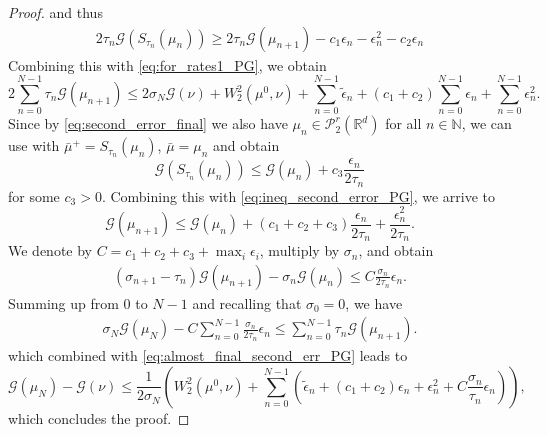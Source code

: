 \documentclass[11pt]{article}
\newcommand{\cP}{\mathcal{P}}
\newcommand{\cG}{\mathcal{G}}
\newcommand{\cT}{S}
\newcommand{\R}{\mathbb{R}}
\newcommand{\N}{\mathbb{N}}
\numberwithin{equation}{section}
\begin{document}
\begin{proof}
	and thus
	\begin{equation}\label{eq:ineq_second_error_PG}
		\begin{aligned}
			2\tau_n\mathcal{G}(\cT_{\tau_{n}}( \mu_{n})) \geq 2\tau_n\mathcal{G}(\mu_{n+1}) - c_1\epsilon_n - \epsilon_n^2 - c_2 \epsilon_n
		\end{aligned}
	\end{equation}
	Combining this with \eqref{eq:for_rates1_PG}, we obtain
	\begin{equation}\label{eq:almost_final_second_err_PG}
		2\sum_{n=0}^{N-1}\tau_n\cG(\mu_{n+1})\leq 2\sigma_N \cG(\nu)+W_2^2(\mu^0,\nu)+\sum_{n=0}^{N-1}\tilde{\epsilon}_n+(c_1+c_2)\sum_{n=0}^{N-1}\epsilon_n + \sum_{n=0}^{N-1}\epsilon_n^2.
	\end{equation}
	Since by \eqref{eq:second_error_final} we also have $\mu_n\in \cP_2^r(\R^d)$ for all $n\in \N$, we can use  with $\bar \mu^+=\cT_{\tau_{n}}( \mu_{n})$, $\bar \mu = \mu_n$ and obtain
	\begin{equation}
		\mathcal{G}(\cT_{\tau_{n}}( \mu_{n})) \leq \mathcal{G}(\mu_n) + c_3\frac{\epsilon_n}{2\tau_n}
	\end{equation}
	for some $c_3 > 0$. Combining this with \eqref{eq:ineq_second_error_PG}, we arrive to
	\begin{equation*}
		\mathcal{G}(\mu_{n+1}) \leq \mathcal{G}(\mu_n) + (c_1+c_2+c_3)\frac{\epsilon_n}{2\tau_n} + \frac{\epsilon_n^2}{2\tau_n}.
	\end{equation*}
	We denote by $C = c_1+c_2+c_3+\max_i \epsilon_i$, multiply by $\sigma_n$, and obtain
	\begin{equation}
		\begin{aligned}
			(\sigma_{n+1}-\tau_n)\cG(\mu_{n+1}) - \sigma_{n}\cG(\mu_n) \leq C\frac{\sigma_n}{2\tau_n}\epsilon_n.
		\end{aligned}
	\end{equation}
	Summing up from $0$ to $N-1$ and recalling that $\sigma_0=0$, we have
	\begin{equation}
		\begin{aligned}
			\sigma_{N}\cG(\mu_N) - C \sum_{n=0}^{N-1}\frac{\sigma_n}{2\tau_n}\epsilon_{n} \leq \sum_{n=0}^{N-1}\tau_n \cG(\mu_{n+1}).
		\end{aligned}
	\end{equation}
	which combined with \eqref{eq:almost_final_second_err_PG} leads to
	\begin{equation*}
		\cG(\mu_{N}) - \cG(\nu) \leq \frac{1}{2\sigma_N}\left(W_2^2(\mu^0,\nu)+\sum_{n=0}^{N-1}\left(\tilde{\epsilon}_n+(c_1+c_2)\epsilon_n + \epsilon_n^2+C\frac{\sigma_n}{\tau_n}\epsilon_{n}\right)\right),
	\end{equation*}
	which concludes the proof.
\end{proof}
\end{document}
